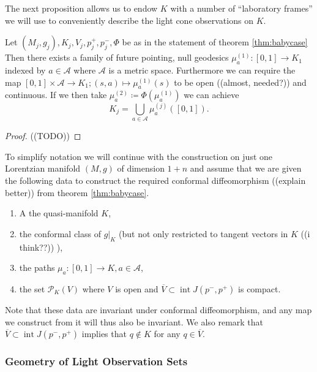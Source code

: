 The next proposition allows us to endow $K$ with a number of \enquote{laboratory frames} we will use to conveniently describe the light cone observations on $K$.
\begin{proposition}
Let $(M_j,g_j), K_j, V_j, p_j^+,p_j^-, \Phi$ be as in the statement of theorem \ref{thm:babycase}
Then there exists a family of future pointing, null geodesics $\mu_a^{(1)}:[0,1]\to K_1$ indexed by $a\in \mathcal{A}$ where $\mathcal{A}$ is a metric space. Furthermore we can require the map $[0,1]\times\mathcal{A}\to K_1; (s,a)\mapsto \mu^{(1)}_a(s)$ to be open ((almost, needed?)) and continuous. If we then take $\mu^{(2)}_a\coloneqq\Phi(\mu^{(1)}_a)$ we can achieve
\begin{equation}\label{eq:frameunion}
K_j = \bigcup_{a\in \mathcal{A}}\mu^{(j)}_a([0,1]).
\end{equation}
\end{proposition}
\begin{proof}
((TODO))
\end{proof}

\begin{remark}\label{rmk:data}To simplify notation we will continue with the construction on just one Lorentzian manifold $(M,g)$ of dimension $1+n$ and assume that we are given the following data to construct the required conformal diffeomorphism ((explain better)) from theorem \ref{thm:babycase}.

\begin{enumerate}
    \item A the quasi-manifold $K$,
    \item the conformal class of $g\rvert_K$ (but not only restricted to tangent vectors in $K$ ((i think??)) ),
    \item the paths $\mu_a:[0,1]\to K, a\in \mathcal{A}$,
    \item the set $\mathcal{P}_K(V)$ where $V$ is open and $\overline{V}\subset \operatorname{int} J(p^-,p^+)$ is compact.
\end{enumerate}
Note that these data are invariant under conformal diffeomorphism, and any map we construct from it will thus also be invariant. We also remark that $\overline{V}\subset \operatorname{int} J(p^-,p^+)$ implies that $q\notin K$ for any $q\in \overline{V}$. 
\end{remark}

\subsubsection{Geometry of Light Observation Sets}


